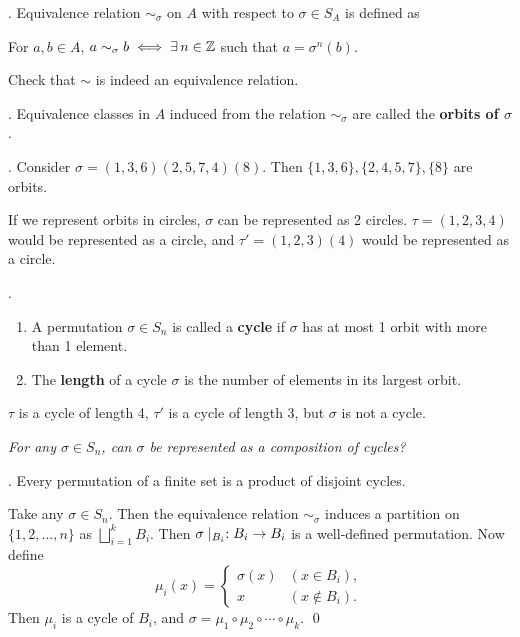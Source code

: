 
. Equivalence relation \(\sim_\sigma\) on \(A\) with respect to \(\sigma \in S_A\) is defined as
\begin{center}
    For \(a, b \in A\), \(a \sim_\sigma b \iff \exists n \in \Z\) such that \(a = \sigma^n(b)\).
\end{center}

\rmk Check that \(\sim\) is indeed an equivalence relation.

.  Equivalence classes in \(A\) induced from the relation \(\sim_\sigma\) are called the \textbf{orbits of \(\sigma\)}.

\ex. Consider \(\sigma = (1, 3, 6) (2, 5, 7, 4) (8)\). Then \(\{1, 3, 6\}, \{2, 4, 5, 7\}, \{8\}\) are orbits.

If we represent orbits in circles, \(\sigma\) can be represented as 2 circles. \(\tau = (1, 2, 3, 4)\) would be represented as a circle, and \(\tau' = (1, 2, 3)(4)\) would be represented as a circle.

. 
\begin{enumerate}
    \item A permutation \(\sigma \in S_n\) is called a \textbf{cycle} if \(\sigma\) has at most 1 orbit with more than 1 element.
    \item The \textbf{length} of a cycle \(\sigma\) is the number of elements in its largest orbit.
\end{enumerate}

\(\tau\) is a cycle of length 4, \(\tau'\) is a cycle of length 3, but \(\sigma\) is not a cycle.

\question \textit{For any \(\sigma \in S_n\), can \(\sigma\) be represented as a composition of cycles?}

\thm. Every permutation of a finite set is a product of disjoint cycles.

\pf Take any \(\sigma \in S_n\). Then the equivalence relation \(\sim_\sigma\) induces a partition on \(\{1, 2, \dots, n\}\) as \(\bigsqcup_{i = 1}^k B_i\). Then \(\sigma \mid_{B_i} : B_i \rightarrow B_i\) is a well-defined permutation. Now define
\[
    \mu_i(x) = \begin{cases}
        \sigma(x) & (x \in B_i), \\ x & (x \notin B_i).
    \end{cases}
\]
Then \(\mu_i\) is a cycle of \(B_i\), and \(\sigma = \mu_1 \circ \mu_2 \circ \cdots \circ \mu_k\). \qed

